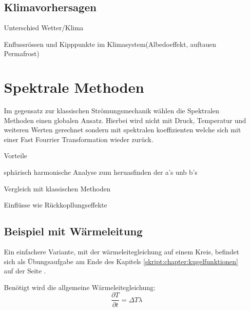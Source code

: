 \begin{refsection}
\subsection{Klimavorhersagen
\label{subsection:klima:entstehung}}
Unterschied Wetter/Klima

Enflussrössen und Kipppunkte im Klimasystem(Albedoeffekt, auftauen Permafrost)

 










\section{Spektrale Methoden
\label{section:klima:spektrale}}
Im gegensatz zur klassischen Strömungsmechanik wählen die Spektralen Methoden einen globalen Ansatz. Hierbei wird nicht mit Druck, Temperatur und weiteren Werten gerechnet sondern mit spektralen koeffizienten welche sich mit einer Fast Fourrier Transformation wieder zurück.

Vorteile

sphärisch harmonische Analyse zum heruasfinden der a's unb b's

Vergleich mit klassischen Methoden

Einflüsse wie Rückkopllungseffekte





\subsection{Beispiel mit Wärmeleitung
\label{subsection:klima:beispiel}}
Ein einfachere Variante, mit der wärmeleitegleichung auf einem Kreis, befindet sich als Übungsaufgabe am Ende des Kapitels \ref{skript:chapter:kugelfunktionen}  auf der Seite \pageref{skript:1101:pdgl}.

Benötigt wird die allgemeine Wärmeleitegleichung:
\begin{equation}
\frac{\partial T}{\partial t} = \Delta T  \lambda
\label{klima:bsp:pdgl}
\end{equation}





\end{refsection}
